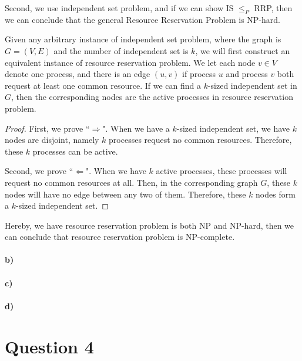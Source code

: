 \documentclass[letter,12pt]{article}
\begin{document}
Second, we use independent set problem, and if we can show IS $\le_P$ RRP, then we 
can conclude that the general Resource Reservation Problem is NP-hard.

Given any arbitrary instance of independent set problem, where the graph is $G=(V, E)$
and the number of independent set is $k$, we will first construct an equivalent instance
of resource reservation problem. We let each node $v \in V$ denote one process, and
there is an edge $(u, v)$ if process $u$ and process $v$ both request at least one
common resource. If we can find a $k$-sized independent set in $G$, then the 
corresponding nodes are the active processes in resource reservation problem.
\begin{proof}
First, we prove ``$\Rightarrow$". When we have a $k$-sized independent set, we
have $k$ nodes are disjoint, namely $k$ processes request no common resources.
Therefore, these $k$ processes can be active.

Second, we prove ``$\Leftarrow$". When we have $k$ active processes, these 
processes will request no common resources at all. Then, in the corresponding graph
$G$, these $k$ nodes will have no edge between any two of them. Therefore, these
$k$ nodes form a $k$-sized independent set.
\end{proof}

Hereby, we have resource reservation problem is both NP and NP-hard, then we can 
conclude that resource reservation problem is NP-complete.

\paragraph*{b)}
\paragraph*{c)}
\paragraph*{d)}
\section*{Question 4}
\end{document}
